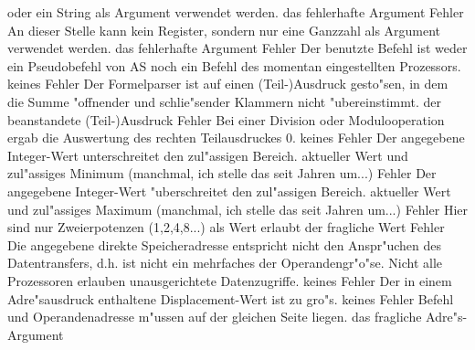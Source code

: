 \documentclass[12pt,a4paper,twoside]{report}
\begin{document}
\begin{description}
{                 oder ein String als Argument verwendet werden.}
               {das fehlerhafte Argument}
               {Fehler}
               {An dieser Stelle kann kein Register, sondern nur eine Ganzzahl
                als Argument verwendet werden.}
               {das fehlerhafte Argument}
               {Fehler}
               {Der benutzte Befehl ist weder ein Pseudobefehl
                von AS noch ein Befehl des momentan eingestellten
                Prozessors.}
               {keines}
               {Fehler}
               {Der Formelparser ist auf einen (Teil-)Ausdruck
                gesto"sen, in dem die Summe "offnender und schlie"sender
                Klammern nicht "ubereinstimmt.}
               {der beanstandete (Teil-)Ausdruck}
               {Fehler}
               {Bei einer Division oder Modulooperation ergab
                die Auswertung des rechten Teilausdruckes 0.}
               {keines}
               {Fehler}
               {Der angegebene Integer-Wert unterschreitet
                den zul"assigen Bereich.}
               {aktueller Wert und zul"assiges Minimum
	        (manchmal, ich stelle das seit Jahren um...)}
               {Fehler}
               {Der angegebene Integer-Wert "uberschreitet
                den zul"assigen Bereich.}
               {aktueller Wert und zul"assiges Maximum
	        (manchmal, ich stelle das seit Jahren um...)}
               {Fehler}
               {Hier sind nur Zweierpotenzen (1,2,4,8...)
                als Wert erlaubt}
               {der fragliche Wert}
               {Fehler}
               {Die angegebene direkte Speicheradresse
                entspricht nicht den Anspr"uchen des Datentransfers, d.h.
                ist nicht ein mehrfaches der Operandengr"o"se.  Nicht alle
                Prozessoren erlauben unausgerichtete Datenzugriffe.}
               {keines}
               {Fehler}
               {Der in einem Adre"sausdruck enthaltene
                Displacement-Wert ist zu gro"s.}
               {keines}
               {Fehler}
               {Befehl und Operandenadresse m"ussen
                auf der gleichen Seite liegen.}
               {das fragliche Adre"s-Argument}

\end{description}
\end{document}
